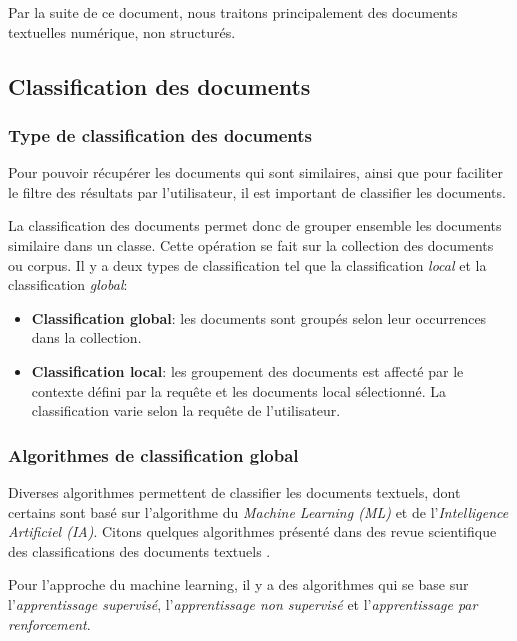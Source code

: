 Par la suite de ce document, nous traitons principalement des documents textuelles numérique, non structurés.

\subsection{Classification des documents}
\subsubsection{Type de classification des documents}
Pour pouvoir récupérer les documents qui sont similaires, ainsi que pour faciliter le filtre des résultats par l'utilisateur, il est important de classifier les documents.

La classification des documents permet donc de grouper ensemble les documents similaire dans un classe. Cette opération se fait sur la collection des documents ou corpus. Il y a deux types de classification \citep*{modern-ir} tel que la classification \textit{local} et la classification \textit{global}:
\begin{itemize}
    \item \textbf{Classification global}: les documents sont groupés selon leur occurrences dans la collection.
    \item \textbf{Classification local}: les groupement des documents est affecté par le contexte défini par la requête et les documents local sélectionné. La classification varie selon la requête de l'utilisateur.
\end{itemize}

\subsubsection{Algorithmes de classification global}
Diverses algorithmes permettent de classifier les documents textuels, dont certains sont basé sur l'algorithme du \emph{Machine Learning (ML)} et de l'\emph{Intelligence Artificiel (IA)}. Citons quelques algorithmes présenté dans des revue scientifique des classifications des documents textuels \citep*{classification-text-documents,classification-text-documents-ml}.

Pour l'approche du machine learning, il y a des algorithmes qui se base sur l'\emph{apprentissage supervisé}, l'\emph{apprentissage non supervisé} et l'\emph{apprentissage par renforcement}.

